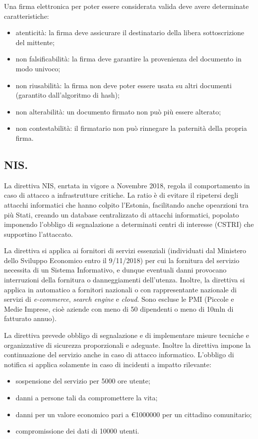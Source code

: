 \documentclass[a4page, 11pt, twocolumn]{article}
\begin{document}
Una firma elettronica per poter essere considerata valida deve avere determinate caratteristiche:
\begin{itemize}
\item atenticità: la firma deve assicurare il destinatario della libera sottoscrizione del mittente;
\item non falsificabilità: la firma deve garantire la provenienza del documento in modo univoco;
\item non riusabilità: la firma non deve poter essere usata su altri documenti (garantito dall'algoritmo di hash);
\item non alterabilità: un documento firmato non può più essere alterato;
\item non contestabilità: il firmatario non può rinnegare la paternità della propria firma.
\end{itemize}

\subsection{NIS.}
La direttiva NIS, enrtata in vigore a Novembre 2018, regola il comportamento in caso di attacco a infrastrutture critiche.
La ratio è di evitare il ripetersi degli attacchi informatici che hanno colpito l'Estonia, facilitando anche opearzioni tra più Stati, creando un database centralizzato di attacchi informatici, popolato imponendo l'obbligo di segnalazione a determinati centri di interesse (CSTRI) che supportino l'attaccato.

La direttiva si applica ai fornitori di servizi essenziali (individuati dal Ministero dello Sviluppo Economico entro il 9/11/2018) per cui la fornitura del servizio necessita di un Sistema Informativo, e dunque eventuali danni provocano interruzioni della fornitura o danneggiamenti dell'utenza.
Inoltre, la direttiva si applica in automatico a fornitori nazionali o con rappresentante nazionale di servizi di \textit{e-commerce}, \textit{search engine} e \textit{cloud}.
Sono escluse le PMI (Piccole e Medie Imprese, cioè aziende con meno di 50 dipendenti o meno di 10mln di fatturato annuo).

La direttiva prevede obbligo di segnalazione e di implementare misure tecniche e organizzative di sicurezza proporzionali e adeguate.
Inoltre la direttiva impone la continuazione del servizio anche in caso di attacco informatico.
L'obbligo di notifica si applica solamente in caso di incidenti a impatto rilevante:
\begin{itemize}
\item sospensione del servizio per 5000 ore utente;
\item danni a persone tali da compromettere la vita;
\item danni per un valore economico pari a \euro{1000000} per un cittadino comunitario;
\item compromissione dei dati di 10000 utenti.
\end{itemize}
\end{document}
